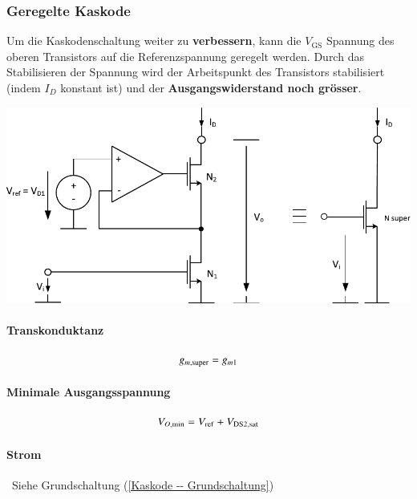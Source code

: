 \subsubsection{Geregelte Kaskode}
Um die Kaskodenschaltung weiter zu \textbf{verbessern}, kann die $V_\text{GS}$ Spannung des oberen Transistors auf die Referenzspannung geregelt werden.
Durch das Stabilisieren der Spannung wird der Arbeitspunkt des Transistors stabilisiert (indem $I_D$ konstant ist) und der \textbf{Ausgangswiderstand noch grösser}.

\smallskip

\begin{minipage}[t]{0.5\columnwidth}
    \includegraphics[width=\columnwidth, align=t]{images/05_stromquelle_geregelte_kaskode_opamp.pdf}
\end{minipage}
\hfill
\begin{minipage}[t]{0.46\columnwidth}

    \paragraph{Transkonduktanz}

    \vspace{-0.3cm}
    \[
        g_{m,\rm super} = g_{m1}
    \]            

    \paragraph{Minimale Ausgangsspannung}

    \vspace{-0.2cm}
    \[
        V_{O, \rm min} =  V_{\rm ref} + V_{\rm DS2, sat}
    \]

    \paragraph{Strom}

    \textrightarrow\ Siehe Grundschaltung (\ref{Kaskode -- Grundschaltung})
\end{minipage}


